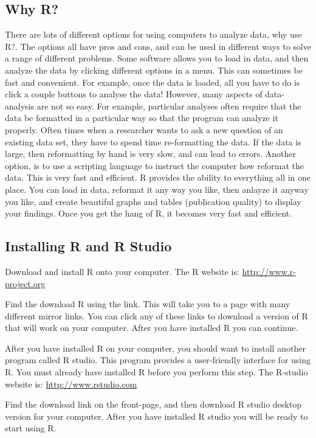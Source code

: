 \documentclass[]{book}
\begin{document}
\subsection{Why R?}\label{why-r}

There are lots of different options for using computers to analyze data,
why use R?. The options all have pros and cons, and can be used in
different ways to solve a range of different problems. Some software
allows you to load in data, and then analyze the data by clicking
different options in a menu. This can sometimes be fast and convenient.
For example, once the data is loaded, all you have to do is click a
couple buttons to analyse the data! However, many aspects of
data-analysis are not so easy. For example, particular analyses often
require that the data be formatted in a particular way so that the
program can analyze it properly. Often times when a researcher wants to
ask a new question of an existing data set, they have to spend time
re-formatting the data. If the data is large, then reformatting by hand
is very slow, and can lead to errors. Another option, is to use a
scripting language to instruct the computer how reformat the data. This
is very fast and efficient. R provides the ability to everything all in
one place. You can load in data, reformat it any way you like, then
anlayze it anyway you like, and create beautiful graphs and tables
(publication quality) to display your findings. Once you get the hang of
R, it becomes very fast and efficient.

\subsection{Installing R and R Studio}\label{installing-r-and-r-studio}

Download and install R onto your computer. The R website is:
\url{http://www.r-project.org}

Find the download R using the link. This will take you to a page with
many different mirror links. You can click any of these links to
download a version of R that will work on your computer. After you have
installed R you can continue.

After you have installed R on your computer, you should want to install
another program called R studio. This program provides a user-friendly
interface for using R. You must already have installed R before you
perform this step. The R-studio website is: \url{http://www.rstudio.com}

Find the download link on the front-page, and then download R studio
desktop version for your computer. After you have installed R studio you
will be ready to start using R.
\end{document}
